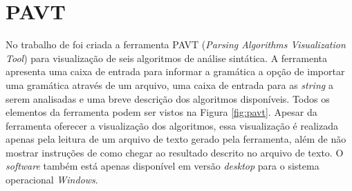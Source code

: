 \begin{figure}[ht]
    \captionsetup{width=16cm}
\end{figure}

\section{PAVT}
No trabalho de \textcite{sangal2018pavt} foi criada a ferramenta PAVT (\textit{Parsing Algorithms Visualization Tool}) para visualização de seis algoritmos de análise sintática. A ferramenta apresenta uma caixa de entrada para informar a gramática a opção de importar uma gramática através de um arquivo, uma caixa de entrada para as \textit{string} a serem analisadas e uma breve descrição dos algoritmos disponíveis. Todos os elementos da ferramenta podem ser vistos na Figura \ref{fig:pavt}. Apesar da ferramenta oferecer a visualização dos algoritmos, essa visualização é realizada apenas pela leitura de um arquivo de texto gerado pela ferramenta, além de não mostrar instruções de como chegar ao resultado descrito no arquivo de texto. O \textit{software} também está apenas disponível em versão \textit{desktop} para o sistema operacional \textit{Windows}.

